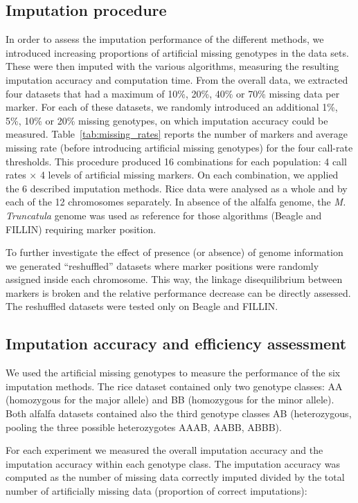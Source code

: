 \subsection{Imputation procedure}
\label{sec:imputation_procedure}
In order to assess the imputation performance of the different methods, we introduced increasing proportions of artificial missing genotypes in the data sets. These were then imputed with the various algorithms, measuring the resulting imputation accuracy and computation time. From the overall data, we extracted four datasets that had a maximum of 10\%, 20\%, 40\% or 70\% missing data per marker. For each of these datasets, we randomly introduced an additional 1\%, 5\%, 10\% or 20\% missing genotypes, on which imputation accuracy could be measured. Table~\ref{tab:missing_rates} reports the number of markers and average missing rate (before introducing artificial missing genotypes) for the four call-rate thresholds. This procedure produced 16 combinations for each population: 4 call rates $\times$ 4 levels of artificial missing markers. On each combination, we applied the 6 described imputation methods. Rice data were analysed as a whole and by each of the 12 chromosomes separately. In absence of the alfalfa genome, the \emph{M. Truncatula} genome was used as reference for those algorithms (Beagle and FILLIN) requiring marker position. 

To further investigate the effect of presence (or absence) of genome information we generated ``reshuffled'' datasets where marker positions were randomly assigned inside each chromosome. This way, the linkage disequilibrium between markers is broken and the relative performance decrease can be directly assessed. The reshuffled datasets were tested only on Beagle and FILLIN.  


\subsection{Imputation accuracy and efficiency assessment}
\label{sec:imputation_accuracy_and_efficiency_assessment}
We used the artificial missing genotypes to measure the performance of the six imputation methods. The rice dataset contained only two genotype classes: AA (homozygous for the major allele) and BB (homozygous for the minor allele). Both alfalfa datasets contained also the third genotype classes AB (heterozygous, pooling the three possible heterozygotes AAAB, AABB, ABBB).

For each experiment we measured the overall imputation accuracy and the imputation accuracy within each genotype class. The imputation accuracy was computed as the number of missing data correctly imputed divided by the total number of artificially missing data (proportion of correct imputations):

